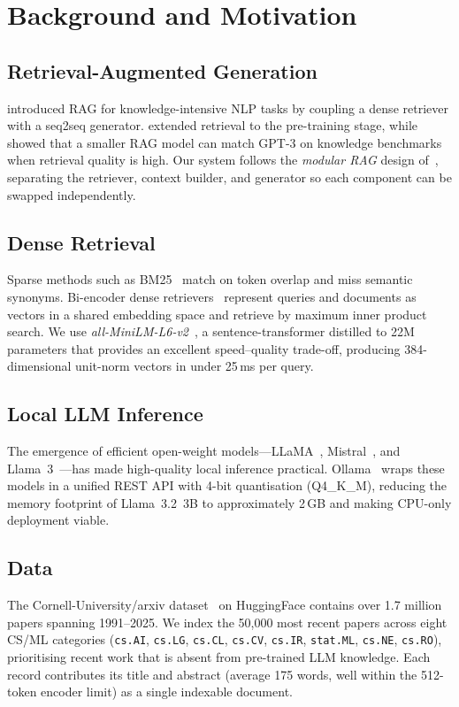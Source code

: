 \documentclass[paper=a4, fontsize=11pt]{scrartcl}
\begin{document}
\section{Background and Motivation}

\subsection{Retrieval-Augmented Generation}
\citet{rag2020} introduced RAG for knowledge-intensive NLP tasks by coupling a
dense retriever with a seq2seq generator.
\citet{realm2020} extended retrieval to the pre-training stage, while
\citet{atlas2022} showed that a smaller RAG model can match GPT-3 on knowledge
benchmarks when retrieval quality is high.
Our system follows the \textit{modular RAG} design of~\citet{modularrag2023},
separating the retriever, context builder, and generator so each component can
be swapped independently.

\subsection{Dense Retrieval}
Sparse methods such as BM25~\citep{bm25} match on token overlap and miss
semantic synonyms.
Bi-encoder dense retrievers~\citep{dpr2020} represent queries and documents as
vectors in a shared embedding space and retrieve by maximum inner product
search.
We use \textit{all-MiniLM-L6-v2}~\citep{reimers2019sentencebert}, a
sentence-transformer distilled to 22M parameters that provides an excellent
speed--quality trade-off, producing 384-dimensional unit-norm vectors in under
25\,ms per query.

\subsection{Local LLM Inference}
The emergence of efficient open-weight models---LLaMA~\citep{llama2023},
Mistral~\citep{mistral2023}, and Llama~3~\citep{llama3}---has made high-quality
local inference practical.
Ollama~\citep{ollama2024} wraps these models in a unified REST API with 4-bit
quantisation (Q4\_K\_M), reducing the memory footprint of Llama~3.2~3B to
approximately 2\,GB and making CPU-only deployment viable.

\subsection{Data}
The Cornell-University/arxiv dataset~\citep{clement2019arxiv} on HuggingFace
contains over 1.7 million papers spanning 1991--2025.
We index the 50{,}000 most recent papers across eight CS/ML categories
(\texttt{cs.AI}, \texttt{cs.LG}, \texttt{cs.CL}, \texttt{cs.CV},
\texttt{cs.IR}, \texttt{stat.ML}, \texttt{cs.NE}, \texttt{cs.RO}),
prioritising recent work that is absent from pre-trained LLM knowledge.
Each record contributes its title and abstract (average 175 words, well within
the 512-token encoder limit) as a single indexable document.
\end{document}
